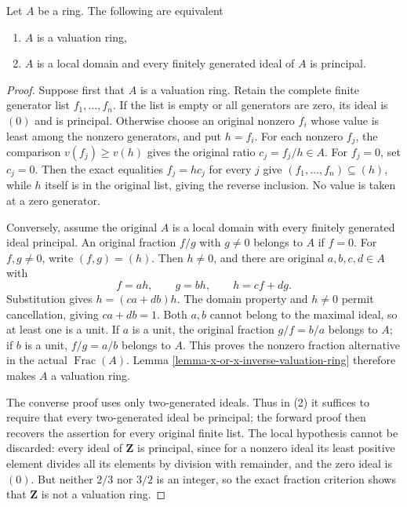 \begin{lemma}
\label{lemma-characterize-valuation-ring}
Let $A$ be a ring. The following are equivalent
\begin{enumerate}
\item $A$ is a valuation ring,
\item $A$ is a local domain and every finitely generated
ideal of $A$ is principal.
\end{enumerate}
\end{lemma}

\begin{proof}
Suppose first that $A$ is
a valuation ring. Retain
the complete finite generator
list $f_1,\ldots,f_n$.
If the list is empty
or all generators are zero,
its ideal is $(0)$ and
is principal. Otherwise choose
an original nonzero $f_i$
whose value is least among
the nonzero generators, and
put $h=f_i$. For each
nonzero $f_j$, the comparison
$v(f_j)\geq v(h)$ gives
the original ratio $c_j=f_j/h\in A$.
For $f_j=0$, set $c_j=0$.
Then the exact equalities
$f_j=hc_j$ for every $j$
give $(f_1,\ldots,f_n)\subseteq(h)$,
while $h$ itself is in
the original list, giving
the reverse inclusion.
No value is taken at
a zero generator.

Conversely, assume the original
$A$ is a local domain
with every finitely generated
ideal principal. An original
fraction $f/g$ with $g\neq0$
belongs to $A$ if $f=0$.
For $f,g\neq0$, write
$(f,g)=(h)$. Then $h\neq0$,
and there are original
$a,b,c,d\in A$ with
$$
f=ah,\qquad g=bh,\qquad h=cf+dg.
$$
Substitution gives
$h=(ca+db)h$. The domain
property and $h\neq0$ permit
cancellation, giving $ca+db=1$.
Both $a,b$ cannot belong
to the maximal ideal,
so at least one is a
unit. If $a$ is a
unit, the original fraction
$g/f=b/a$ belongs to $A$;
if $b$ is a unit,
$f/g=a/b$ belongs to $A$.
This proves the nonzero
fraction alternative in the
actual $\operatorname{Frac}(A)$.
Lemma
\ref{lemma-x-or-x-inverse-valuation-ring}
therefore makes $A$ a
valuation ring.

The converse proof uses
only two-generated ideals.
Thus in (2) it suffices
to require that every
two-generated ideal be principal;
the forward proof then
recovers the assertion for
every original finite list.
The local hypothesis cannot
be discarded: every ideal
of $\mathbf Z$ is principal,
since for a nonzero ideal
its least positive element
divides all its elements
by division with remainder,
and the zero ideal is
$(0)$. But neither $2/3$
nor $3/2$ is an integer,
so the exact fraction
criterion shows that $\mathbf Z$
is not a valuation ring.
\end{proof}

